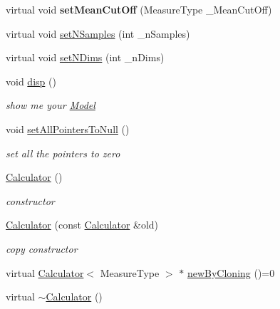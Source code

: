 \begin{DoxyCompactItemize}
\item 
\hypertarget{class_ox_1_1_calculator_ad945e3f4dd3405c940bc8a22ea3f3ee9}{virtual void {\bfseries set\-Mean\-Cut\-Off} (Measure\-Type \-\_\-\-Mean\-Cut\-Off)}\label{class_ox_1_1_calculator_ad945e3f4dd3405c940bc8a22ea3f3ee9}

\item 
virtual void \hyperlink{class_ox_1_1_calculator_a1d0d07b7840883449168448983d43289}{set\-N\-Samples} (int \-\_\-n\-Samples)
\item 
virtual void \hyperlink{class_ox_1_1_calculator_a40c854c0d75685ecc1da531f7400e3b1}{set\-N\-Dims} (int \-\_\-n\-Dims)
\item 
\hypertarget{class_ox_1_1_calculator_a938a4bb0d2bc586bfb6982df28befbbf}{void \hyperlink{class_ox_1_1_calculator_a938a4bb0d2bc586bfb6982df28befbbf}{disp} ()}\label{class_ox_1_1_calculator_a938a4bb0d2bc586bfb6982df28befbbf}

\begin{DoxyCompactList}\small\item\em show me your \hyperlink{class_ox_1_1_model}{Model} \end{DoxyCompactList}\item 
\hypertarget{class_ox_1_1_calculator_acaaddad6379df03cccd825d565c9dd0e}{void \hyperlink{class_ox_1_1_calculator_acaaddad6379df03cccd825d565c9dd0e}{set\-All\-Pointers\-To\-Null} ()}\label{class_ox_1_1_calculator_acaaddad6379df03cccd825d565c9dd0e}

\begin{DoxyCompactList}\small\item\em set all the pointers to zero \end{DoxyCompactList}\item 
\hypertarget{class_ox_1_1_calculator_a4a3762f0c260cb0e34f72e40a7329d27}{\hyperlink{class_ox_1_1_calculator_a4a3762f0c260cb0e34f72e40a7329d27}{Calculator} ()}\label{class_ox_1_1_calculator_a4a3762f0c260cb0e34f72e40a7329d27}

\begin{DoxyCompactList}\small\item\em constructor \end{DoxyCompactList}\item 
\hypertarget{class_ox_1_1_calculator_a600434abcaff13ac70d0d4b06b9df583}{\hyperlink{class_ox_1_1_calculator_a600434abcaff13ac70d0d4b06b9df583}{Calculator} (const \hyperlink{class_ox_1_1_calculator}{Calculator} \&old)}\label{class_ox_1_1_calculator_a600434abcaff13ac70d0d4b06b9df583}

\begin{DoxyCompactList}\small\item\em copy constructor \end{DoxyCompactList}\item 
virtual \hyperlink{class_ox_1_1_calculator}{Calculator}$<$ Measure\-Type $>$ $\ast$ \hyperlink{class_ox_1_1_calculator_aaec48f39f9b0ea1b622485cf25fba484}{new\-By\-Cloning} ()=0
\item 
\hypertarget{class_ox_1_1_calculator_a0e0d0f525a80e54f17ab14e4073d780d}{virtual \hyperlink{class_ox_1_1_calculator_a0e0d0f525a80e54f17ab14e4073d780d}{$\sim$\-Calculator} ()}\label{class_ox_1_1_calculator_a0e0d0f525a80e54f17ab14e4073d780d}


\end{DoxyCompactItemize}
